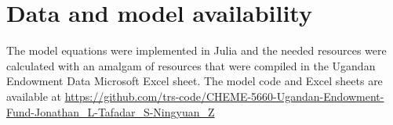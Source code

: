 \documentclass[10pt,twocolumn,twoside,final]{IEEEtran}
\begin{document}
\section{Data and model availability}
The model equations were implemented in Julia and the needed resources were calculated with an amalgam of resources that were compiled in the Ugandan Endowment Data Microsoft Excel sheet.
The model code and Excel sheets are available at \url{https://github.com/trs-code/CHEME-5660-Ugandan-Endowment-Fund-Jonathan_L-Tafadar_S-Ningyuan_Z}



\end{document}
